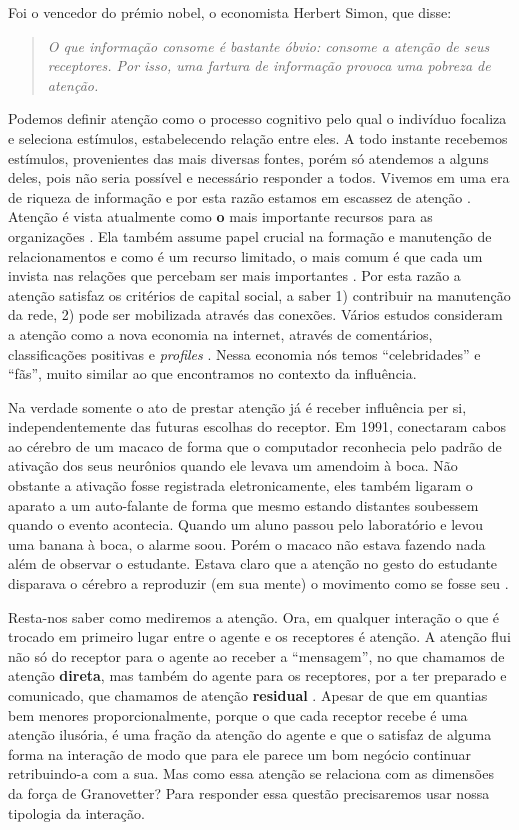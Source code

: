 Foi o vencedor do prémio nobel, o economista Herbert Simon, que disse:

\begin{quote}{\citep{Simon1996}} \emph{O que informação consome é bastante
óbvio: consome a atenção de seus receptores. Por isso, uma fartura de informação
provoca uma pobreza de atenção.}
\end{quote}

Podemos definir atenção como o processo cognitivo pelo qual o indivíduo focaliza
e seleciona estímulos, estabelecendo relação entre eles. A todo instante
recebemos estímulos, provenientes das mais diversas fontes, porém só atendemos a
alguns deles, pois não seria possível e necessário responder a todos. Vivemos em
uma era de riqueza de informação e por esta razão estamos em escassez de atenção
\citep{Goldhaber1997}. Atenção é vista atualmente como \textbf{o} mais importante
recursos para as organizações \citep{Davenport2001}. Ela também assume papel
crucial na formação e manutenção de relacionamentos e como é um recurso limitado,
o mais comum é que cada um invista nas relações que percebam ser mais importantes
\citep{Dindia1993}. Por esta razão a atenção satisfaz os critérios de capital
social, a saber 1) contribuir na manutenção da rede, 2) pode ser mobilizada
através das conexões. Vários estudos consideram a atenção como a nova economia na
internet, através de comentários, classificações positivas e \textit{profiles}
\citep{Humphreys2009, Wu2009, Skageby2009}. Nessa economia nós temos
``celebridades'' e ``fãs'', muito similar ao que encontramos no contexto da
influência.

Na verdade somente o ato de prestar atenção já é receber influência per si,
independentemente das futuras escolhas do receptor. Em 1991,
\citeauthor{Rizzolatti1996} conectaram cabos ao cérebro de um macaco de forma que
o computador reconhecia pelo padrão de ativação dos seus neurônios quando ele
levava um amendoim à boca. Não obstante a ativação fosse registrada
eletronicamente, eles também ligaram o aparato a um auto-falante de forma que
mesmo estando distantes soubessem quando o evento acontecia. Quando um aluno
passou pelo laboratório e levou uma banana à boca, o alarme soou. Porém o macaco
não estava fazendo nada além de observar o estudante. Estava claro que a atenção
no gesto do estudante disparava o cérebro a reproduzir (em sua mente) o movimento
como se fosse seu \citep{Goldhaber2006}.

Resta-nos saber como mediremos a atenção. Ora, em qualquer interação o que é
trocado em primeiro lugar entre o agente e os receptores é atenção. A atenção
flui não só do receptor para o agente ao receber a ``mensagem'', no que chamamos
de atenção \textbf{direta}, mas também do agente para os receptores, por a ter
preparado e comunicado, que chamamos de atenção \textbf{residual}
\citep{Goldhaber1997}. Apesar de que em quantias bem menores proporcionalmente,
porque o que cada receptor recebe é uma atenção ilusória, é uma fração da
atenção do agente e que o satisfaz de alguma forma na interação de modo que para
ele parece um bom negócio continuar retribuindo-a com a sua. Mas como essa
atenção se relaciona com as dimensões da força de Granovetter? Para responder
essa questão precisaremos usar nossa tipologia da interação.

